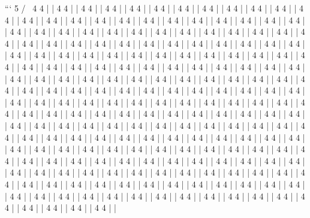 ```
  5
 / \
4   4
|   |
4   4
|   |
4   4
|   |
4   4
|   |
4   4
|   |
4   4
|   |
4   4
|   |
4   4
|   |
4   4
|   |
4   4
|   |
4   4
|   |
4   4
|   |
4   4
|   |
4   4
|   |
4   4
|   |
4   4
|   |
4   4
|   |
4   4
|   |
4   4
|   |
4   4
|   |
4   4
|   |
4   4
|   |
4   4
|   |
4   4
|   |
4   4
|   |
4   4
|   |
4   4
|   |
4   4
|   |
4   4
|   |
4   4
|   |
4   4
|   |
4   4
|   |
4   4
|   |
4   4
|   |
4   4
|   |
4   4
|   |
4   4
|   |
4   4
|   |
4   4
|   |
4   4
|   |
4   4
|   |
4   4
|   |
4   4
|   |
4   4
|   |
4   4
|   |
4   4
|   |
4   4
|   |
4   4
|   |
4   4
|   |
4   4
|   |
4   4
|   |
4   4
|   |
4   4
|   |
4   4
|   |
4   4
|   |
4   4
|   |
4   4
|   |
4   4
|   |
4   4
|   |
4   4
|   |
4   4
|   |
4   4
|   |
4   4
|   |
4   4
|   |
4   4
|   |
4   4
|   |
4   4
|   |
4   4
|   |
4   4
|   |
4   4
|   |
4   4
|   |
4   4
|   |
4   4
|   |
4   4
|   |
4   4
|   |
4   4
|   |
4   4
|   |
4   4
|   |
4   4
|   |
4   4
|   |
4   4
|   |
4   4
|   |
4   4
|   |
4   4
|   |
4   4
|   |
4   4
|   |
4   4
|   |
4   4
|   |
4   4
|   |
4   4
|   |
4   4
|   |
4   4
|   |
4   4
|   |
4   4
|   |
4   4
|   |
4   4
|   |
4   4
|   |
4   4
|   |
4   4
|   |
4   4
|   |
4   4
|   |
4   4
|   |
4   4
|   |
4   4
|   |
4   4
|   |
4   4
|   |
4   4
|   |
4   4
|   |
4   4
|   |
4   4
|   |
4   4
|   |
4   4
|   |
4   4
|   |
4   4
|   |
4   4
|   |
4   4
|   |
4   4
|   |
4   4
|   |
4   4
|   |
4   4
|   |
4   4
|   |
4   4
|   |
4   4
|   |
4   4
|   |
4   4
|   |
4   4
|   |
4   4
|   |
4   4
|   |
4   4
|   |
4   4
|   |
4   4
|   |
4   4
|   |
4   4
|   |
4   4
|   |
4   4
|   |
4   4
|   |
4   4
|   |
4   4
|   |
4   4
|   |
4   4
|   |
4   4
|   |
4   4
|   |
4   4
|   |
4   4
|   |
4   4
|   |
4   4
|   |
4   4
|   |
4   4
|   |
4   4
|   |
4   4
|   |
4   4
|   |
4   4
|   |
4   4
|   |
4   4
|   |
4   4
|   |
4   4
|   |
4   4
|   |
4   4
|   |
4   4
|   |
4   4
|   |
4   4
|   |
4   4
|   |
4   4
|   |
4   4
|   |
4   4
|   |
4   4
|   |
4   4
|   |
4   4
|   |
4   4
|   |
4   4
|   |
4   4
|   |
4   4
|   |
4   4
|   |
4   4
|   |
4   4
|   |
4   4
|   |
4   4
|   |
4   4
|   |
4   4
|   |
4   4
|   |
4   4
|   |
4   4
|   |
4   4
|   |
4   4
|   |
4   4
|   |
4   4
|   |
4   4
|   |
4   4
|   |
4   4
|   |
4   4
|   |
4   4
|   |
4   4
|   |
4   4
|   |
4   4
|   |
4   4
|   |
4   4
|   |
4   4
|   |
4   4
|   |
4   4
|   |
4   4
|   |
4   4
|   |
4   4
|   |
4   4
|   |
4   4
|   |
4   4
|   |
4   4
|   |
4   4
|   |
4   4
|   |
4   4
|   |
4   4
|   |
4   4
|   |
4   4
|   |
4   4
|   |
4   4
|   |
4   4
|   |
4   4
|   |
